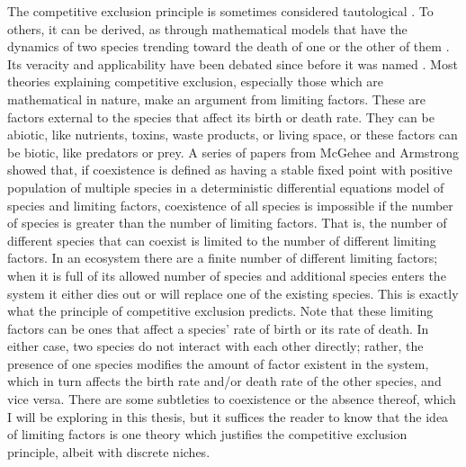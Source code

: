 The competitive exclusion principle is sometimes considered tautological \cite{Hutchinson1957}. 
To others, it can be derived, as through mathematical models that have the dynamics of two species trending toward the death of one or the other of them \cite{MacArthur1967,McGehee1977a,Bomze1983}. 
Its veracity and applicability have been debated since before it was named \cite{Grinnell1917,Elton1927,Hutchinson1957,MacArthur1967,Leibold1995}. 
%
Most theories explaining competitive exclusion, especially those which are mathematical in nature, make an argument from limiting factors. 
These are factors external to the species that affect its birth or death rate. 
They can be abiotic, like nutrients, toxins, waste products, or living space, or these factors can be biotic, like predators or prey. 
A series of papers from McGehee and Armstrong \cite{Armstrong1976,McGehee1977a,Armstrong1980} showed that, if coexistence is defined as having a stable fixed point with positive population of multiple species in a deterministic differential equations model of species and limiting factors, coexistence of all species is impossible if the number of species is greater than the number of limiting factors. 
That is, the number of different species that can coexist is limited to the number of different limiting factors. 
In an ecosystem there are a finite number of different limiting factors; when it is full of its allowed number of species and additional species enters the system it either dies out or will replace one of the existing species. 
This is exactly what the principle of competitive exclusion predicts. 
Note that these limiting factors can be ones that affect a species' rate of birth or its rate of death. 
In either case, two species do not interact with each other directly; rather, the presence of one species modifies the amount of factor existent in the system, which in turn affects the birth rate and/or death rate of the other species, and vice versa. 
There are some subtleties to coexistence or the absence thereof, which I will be exploring in this thesis, but it suffices the reader to know that the idea of limiting factors is one theory which justifies the competitive exclusion principle, albeit with discrete niches. 

